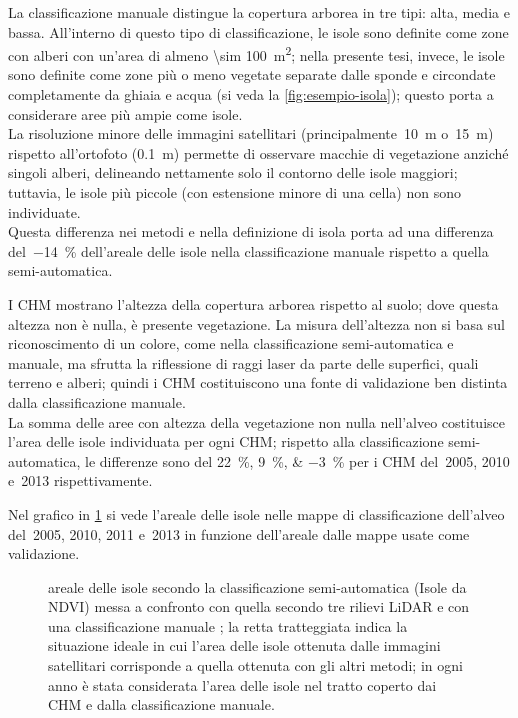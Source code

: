 \begin{aenumerate}
	\item La classificazione manuale  distingue la copertura arborea in tre tipi: alta, media e bassa.
	All'interno di questo tipo di classificazione, le isole sono definite come zone con alberi con un'area di almeno \SI{\sim 100}{\m\tothe{2}}; nella presente tesi, invece, le isole sono definite come zone più o meno vegetate separate dalle sponde e circondate completamente da ghiaia e acqua (si veda la \cref{fig:esempio-isola}); questo porta a considerare aree più ampie come isole.
	\\
	La risoluzione minore delle immagini satellitari (principalmente~\SI{10}{\m} o~\SI{15}{\m}) rispetto all'ortofoto (\SI{0.1}{\m}) permette di osservare macchie di vegetazione anziché singoli alberi, delineando nettamente solo il contorno delle isole maggiori; tuttavia, le isole più piccole (con estensione minore di una cella) non sono individuate.
	\\
	Questa differenza nei metodi e nella definizione di isola porta ad una differenza del~\SI{-14}{\percent} dell'areale delle isole nella classificazione manuale rispetto a quella semi-automatica.
	\item I CHM mostrano l'altezza della copertura arborea rispetto al suolo; dove questa altezza non è nulla, è presente vegetazione.
	La misura dell'altezza non si basa sul riconoscimento di un colore, come nella classificazione semi-automatica e manuale, ma sfrutta la riflessione di raggi laser da parte delle superfici, quali terreno e alberi; quindi i CHM costituiscono una fonte di validazione ben distinta dalla classificazione manuale.
	\\
	La somma delle aree con altezza della vegetazione non nulla nell'alveo costituisce l'area delle isole individuata per ogni CHM; rispetto alla classificazione semi-automatica, le differenze sono del \SIlist[list-separator = {, }, list-final-separator = { e }, retain-explicit-plus]{+22;+9;-3}{\percent} per i CHM del~2005, 2010 e~2013 rispettivamente.
\end{aenumerate}
%
Nel grafico in \cref{graph:validazione-class-is-fl} si vede l'areale delle isole nelle mappe di classificazione dell'alveo del~2005, 2010, 2011 e~2013 in funzione dell'areale dalle mappe usate come validazione.
%
\begin{figure}
	\centering
	
	\caption[validazione della classificazione considerando le aree delle isole]{areale delle isole secondo la classificazione semi-automatica (Isole da NDVI) messa a confronto con quella secondo tre rilievi LiDAR e con una classificazione manuale ; la retta tratteggiata indica la situazione ideale in cui l'area delle isole ottenuta dalle immagini satellitari corrisponde a quella ottenuta con gli altri metodi; in ogni anno è stata considerata l'area delle isole nel tratto coperto dai CHM e dalla classificazione manuale.}
	\label{graph:validazione-class-is-fl}
\end{figure}
